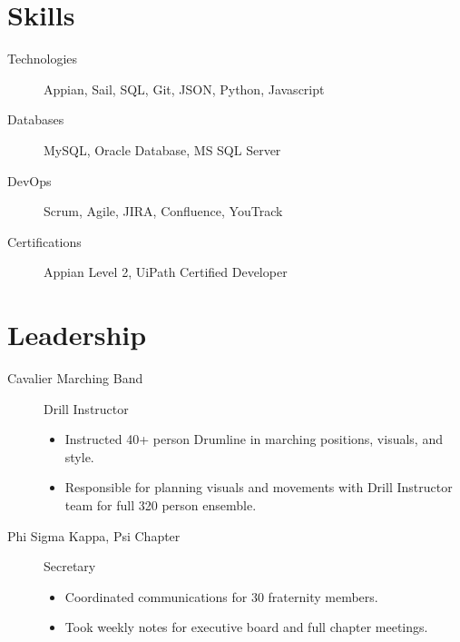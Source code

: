 \documentclass{mycv}
\begin{document}
\section{Skills}
\begin{description}
  \item[Technologies] Appian, Sail, SQL, Git, JSON, Python, Javascript
  \item[Databases] MySQL, Oracle Database, MS SQL Server
  \item[DevOps] Scrum, Agile, JIRA, Confluence, YouTrack
  \item[Certifications] Appian Level 2, UiPath Certified Developer
\end{description}

\section{Leadership}
\vspace{-\parskip}%
\begin{description}
  \item[Cavalier Marching Band] Drill Instructor
  \begin{itemize}
    \item Instructed 40+ person Drumline in marching positions, visuals, and style.
    \item Responsible for planning visuals and movements with Drill Instructor team for full 320 person ensemble.
  \end{itemize} 
  \item[Phi Sigma Kappa, Psi Chapter] Secretary
  \begin{itemize}
    \item Coordinated communications for 30 fraternity members.
    \item Took weekly notes for executive board and full chapter meetings.
  \end{itemize} 
\end{description}
\end{document}
